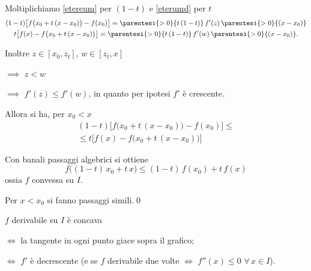 {\begin{itemize}
        Moltiplichiamo \eqref{etereum} per $ (1-t) $ e \eqref{eterumd} per $ t $
        \begin{gather*}
            (1-t)\bigl[f\bigl(x_0+t\,(x-x_0)\bigr)-f(x_0)\bigr]=\parentesi{>0}{t\,(1-t)}\,f'(z)\,\parentesi{>0}{(x-x_0)}\\
            t\bigl[f(x)-f\bigl(x_0+t\,(x-x_0)\bigr)\bigr]=\parentesi{>0}{t\,(1-t)}\,f'(w)\,\parentesi{>0}{(x-x_0)}.
        \end{gather*}

        Inoltre $ z \in [x_0, z_{t} ] $, $ w \in[z_{t}, x ] $ 
        
        $\implies$ $ z<w $ 
        
        $\implies$ $ f'(z)\le f'(w) $, in quanto per ipotesi $ f' $ è crescente.

        Allora si ha, per $ x_0<x $ \begin{multline*}
            (1-t)\bigl[f\bigl(x_0+t\,(x-x_0)\bigr)-f(x_0)\bigr]\le\\\le t\bigl[f(x)-f\bigl(x_0+t\,(x-x_0)\bigr)\bigr]
        \end{multline*}

        Con banali passaggi algebrici si ottiene \[
            f\bigl((1-t)\,x_0+t\,x\bigr)\le (1-t)\,f(x_0)+t\,f(x)
        \] ossia $ f $ convessa su $ I $.

        Per $ x<x_0 $ si fanno passaggi simili.\qed
    \end{itemize}
}



$ f $ derivabile su $ I $ è concava 

$ \iff $ la tangente in ogni punto giace sopra il grafico;

$\iff$ $ f' $ è decrescente (e se $ f $ derivabile due volte $ \iff $ $ f''(x)\le 0 $ $ \forall\, x \in I $).


